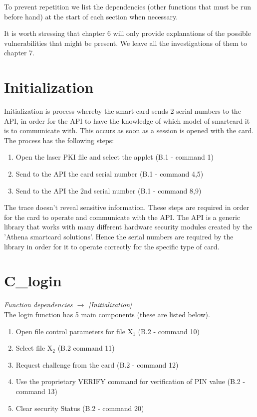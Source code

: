 \documentclass[bsc,frontabs,twoside,singlespacing,parskip,deptreport]{infthesis}     %
\begin{document}
To prevent repetition we list the dependencies (other functions that must be run before hand) at the start of each section when necessary.

It is worth stressing that chapter 6 will only provide explanations of the possible vulnerabilities that might be present. We leave all the investigations of them to chapter 7.


\section{Initialization}

Initialization is process whereby the smart-card sends 2 serial numbers to the API, in order for the API to have the knowledge of which model of smartcard it is to communicate with. This occurs as soon as a session is opened with the card. The process has the following steps:
\begin{enumerate}
\item Open the laser PKI file and select the applet (B.1 - command 1)
\item Send to the API the card serial number (B.1 - command 4,5)
\item Send to the API the 2nd serial number (B.1 - command 8,9)
\end{enumerate}

The trace doesn't reveal sensitive information. These steps are required in order for the card to operate and communicate with the API. The API is a generic library that works with many different hardware security modules created by the 'Athena smartcard solutions'. Hence the serial numbers are required by the library in order for it to operate correctly for the specific type of card.

\section{C\_login}

\textit{Function dependencies $\rightarrow$ [Initialization]}\\


The login function has 5 main components (these are listed below). 

\begin{enumerate}
\item Open file control parameters for file X$_1$ (B.2 - command 10)
\item Select file X$_2$ (B.2 command 11)
\item Request challenge from the card (B.2 - command 12)
\item Use the proprietary VERIFY command for verification of PIN value (B.2 - command 13)
\item Clear security Status (B.2 - command 20)\\
\end{enumerate}
\end{document}
